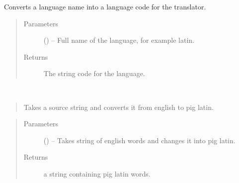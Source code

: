 \documentclass[letterpaper,10pt,english]{sphinxmanual}
\begin{document}

\begin{fulllineitems}
\label{code:hp_spells.langCode}
Converts a language name into a language code for the translator.
\begin{quote}\begin{description}
\item[{Parameters}] \leavevmode
{} () -- Full name of the language, for example latin.

\item[{Returns}] \leavevmode
The string code for the language.

\end{description}\end{quote}

\end{fulllineitems}


\begin{fulllineitems}
\label{code:hp_spells.pigLatin}~\begin{quote}

Takes a source string and converts it from english to pig latin.
\end{quote}
\begin{quote}\begin{description}
\item[{Parameters}] \leavevmode
{} () -- Takes string of english words and changes it into pig latin.

\item[{Returns}] \leavevmode
a string containing pig latin words.

\end{description}\end{quote}

\end{fulllineitems}

\end{document}
